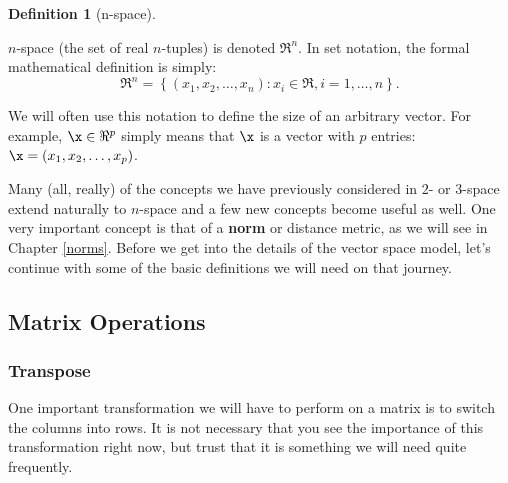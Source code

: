 \documentclass[
]{article}
\theoremstyle{definition}
\newtheorem{definition}{Definition}[section]
\theoremstyle{definition}
\theoremstyle{definition}
\theoremstyle{definition}
\theoremstyle{remark}
\begin{document}
\begin{definition}[n-space]
\protect\hypertarget{def:nspace}{}\label{def:nspace}

\(n\)-space (the set of real \(n\)-tuples) is denoted \(\Re^n\). In set notation, the formal mathematical definition is simply:
\[\Re^n = \left\lbrace (x_1,x_2,\dots,x_n) : x_i \in \Re, i=1,\dots, n\right\rbrace.\]

\end{definition}

We will often use this notation to define the size of an arbitrary vector. For example, \(\x \in \Re^p\) simply means that \(\x\) is a vector with \(p\) entries:
\(\x=(x_1,x_2,\dots,x_p)\).

Many (all, really) of the concepts we have previously considered in \(2\)- or \(3\)-space extend naturally to \(n\)-space and a few new concepts become useful as well. One very important concept is that of a \textbf{norm} or distance metric, as we will see in Chapter \ref{norms}. Before we get into the details of the vector space model, let's continue with some of the basic definitions we will need on that journey.

\hypertarget{matrix-operations}{%
\subsection{Matrix Operations}\label{matrix-operations}}

\hypertarget{transpose}{%
\subsubsection{Transpose}\label{transpose}}

One important transformation we will have to perform on a matrix is to switch the columns into rows. It is not necessary that you see the importance of this transformation right now, but trust that it is something we will need quite frequently.
\end{document}
